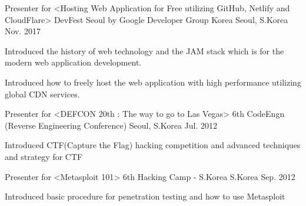 
\begin{cventries}

  \cventry
  {Presenter for <Hosting Web Application for Free utilizing GitHub, Netlify and CloudFlare>} %
  {DevFest Seoul by Google Developer Group Korea} %
  {Seoul, S.Korea} %
  {Nov. 2017} %
  {
    \begin{cvitems} %
    \item {Introduced the history of web technology and the JAM stack which is for the modern web application
      development.}
    \item {Introduced how to freely host the web application with high performance utilizing global CDN services.}
    \end{cvitems}
  }

  \cventry
  {Presenter for <DEFCON 20th : The way to go to Las Vegas>} %
  {6th CodeEngn (Reverse Engineering Conference)} %
  {Seoul, S.Korea} %
  {Jul. 2012} %
  {
    \begin{cvitems} %
    \item {Introduced CTF(Capture the Flag) hacking competition and advanced techniques and strategy for CTF}
    \end{cvitems}
  }

  \cventry
  {Presenter for <Metasploit 101>} %
  {6th Hacking Camp - S.Korea} %
  {S.Korea} %
  {Sep. 2012} %
  {
    \begin{cvitems} %
    \item {Introduced basic procedure for penetration testing and how to use Metasploit}
    \end{cvitems}
  }

\end{cventries}

